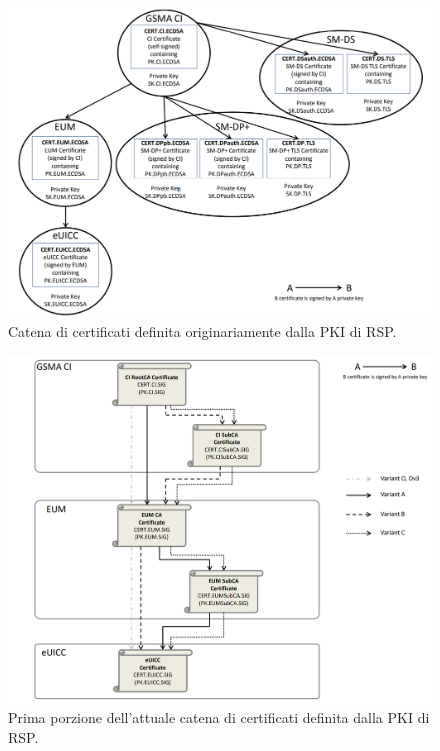 \documentclass[10pt, oneside]{book}
\begin{document}
\begin{figure}
\includegraphics[width=\linewidth]{cert-chain.png}
\caption{Catena di certificati definita originariamente dalla PKI di RSP.}
\label{fig:cert-chain}
\end{figure}
\begin{figure}
\includegraphics[width=\linewidth]{cert-chain-new1.png}
\caption{Prima porzione dell'attuale catena di certificati definita dalla PKI di RSP.}
\label{fig:cert-chain-new1}
\end{figure}
\end{document}
